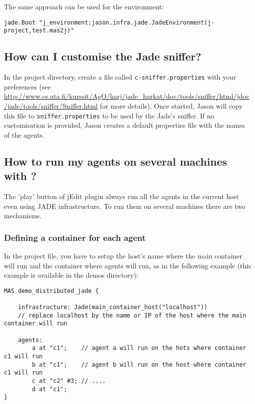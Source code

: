 \documentclass{article}
\newcommand{\jade}[0]{\htlink{\textsc{Jade}}{http://jade.tilab.com/}\xspace}
\begin{document}
\begin{description}
The same approach can be used for the environment:
\begin{verbatim}
jade.Boot "j_environment:jason.infra.jade.JadeEnvironment(j-project,test.mas2j)" 
\end{verbatim}

\subsection{How can I customise the Jade sniffer?}

In the project directory, create a file called
\texttt{c-sniffer.properties} with your preferences (see
\url{http://www.cs.uta.fi/kurssit/AgO/harj/jade_harkat/doc/tools/sniffer/html/jdoc/jade/tools/sniffer/Sniffer.html}
 for more details). Once started, Jason will copy this file to
\texttt{sniffer.properties} to be used by the Jade's sniffer. If no
customisation is provided, Jason creates a default properties file
with the names of the agents.

\subsection{How to run my agents on several machines with \jade?}

The 'play' button of jEdit plugin always run all the agents in the
current host even using JADE infrastructure. To run them on several
machines there are two mechanisms.

\subsubsection{Defining a container for each agent}

In the project file, you have to setup the host's name where the main
container will run and the container where agents will run, as in
the following example (this example is available in the demos
directory):
\begin{verbatim}
MAS demo_distributed_jade {

    infrastructure: Jade(main_container_host("localhost")) 
	// replace localhost by the name or IP of the host where the main container will run

    agents:
        a at "c1";    // agent a will run on the hots where container c1 will run
        b at "c1";    // agent b will run on the host where container c1 will run
        c at "c2" #3; // ....
        d at "c1";
}
\end{verbatim}


\end{description}
\end{document}
